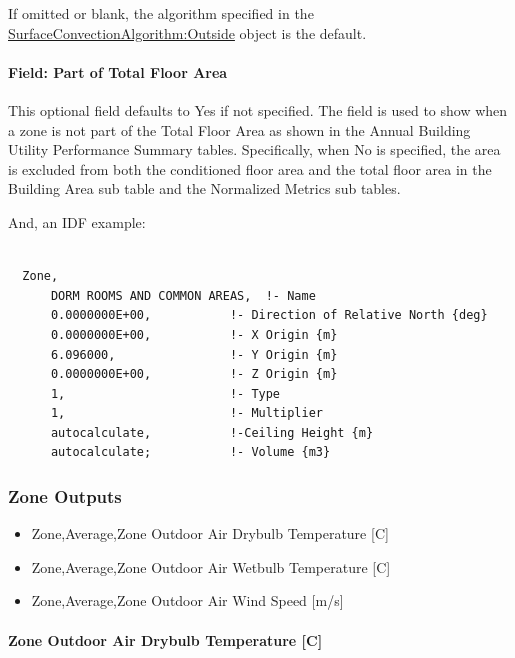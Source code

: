 If omitted or blank, the algorithm specified in the \hyperref[surfaceconvectionalgorithmoutside]{SurfaceConvectionAlgorithm:Outside} object is the default.

\paragraph{Field: Part of Total Floor Area}\label{field-part-of-total-floor-area}

This optional field defaults to Yes if not specified. The field is used to show when a zone is not part of the Total Floor Area as shown in the Annual Building Utility Performance Summary tables. Specifically, when No is specified, the area is excluded from both the conditioned floor area and the total floor area in the Building Area sub table and the Normalized Metrics sub tables.

And, an IDF example:

\begin{lstlisting}

  Zone,
      DORM ROOMS AND COMMON AREAS,  !- Name
      0.0000000E+00,           !- Direction of Relative North {deg}
      0.0000000E+00,           !- X Origin {m}
      6.096000,                !- Y Origin {m}
      0.0000000E+00,           !- Z Origin {m}
      1,                       !- Type
      1,                       !- Multiplier
      autocalculate,           !-Ceiling Height {m}
      autocalculate;           !- Volume {m3}
\end{lstlisting}

\subsubsection{Zone Outputs}\label{outputs-037}

\begin{itemize}
\item
  Zone,Average,Zone Outdoor Air Drybulb Temperature {[}C{]}
\item
  Zone,Average,Zone Outdoor Air Wetbulb Temperature {[}C{]}
\item
  Zone,Average,Zone Outdoor Air Wind Speed {[}m/s{]}
\end{itemize}

\paragraph{Zone Outdoor Air Drybulb Temperature {[}C{]}}\label{zone-outdoor-air-drybulb-temperature-c-000}

